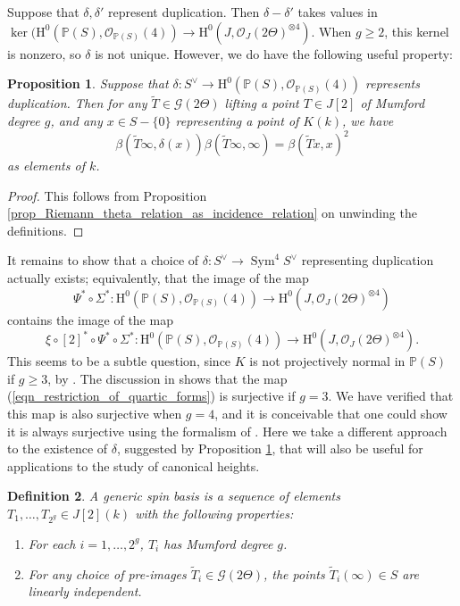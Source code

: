 \documentclass{article} %
\newtheorem{proposition}{Proposition}[section]
\newtheorem{definition}[proposition]{Definition}
\numberwithin{equation}{section}
\DeclareMathOperator{\Sym}{Sym}
\renewcommand{\P}{\mathbb{P}}
\renewcommand{\O}{\mathcal{O}}
\newcommand{\HH}{\mathrm{H}}
\newcommand{\cO}{\mathcal{O}}
\begin{document}
Suppose that $\delta, \delta'$ represent duplication. Then $\delta - \delta'$ takes values in $\ker(\HH^0(\P(S), \cO_{\P(S)}(4)) \to\HH^0(J, \O_J(2 \Theta)^{\otimes 4})$. When $g \geq 2$, this kernel is nonzero, so $\delta$ is not unique. However, we do have the following useful property:
\begin{proposition}\label{prop_pairing_delta_with_torsion_points}
    Suppose that $\delta : S^\vee \to\HH^0(\P(S), \cO_{\P(S)}(4))$ represents duplication. Then for any $\widetilde{T} \in \mathcal{G}(2 \Theta)$ lifting a point $T \in J[2]$ of Mumford degree $g$, and any $x \in S - \{ 0 \}$ representing a point of $K(k)$, we have
    \[ \beta( \widetilde{T} \infty, \delta(x)) \beta(\widetilde{T} \infty, \infty) = \beta(\widetilde{T} x,x)^2\]
    as elements of $k$. 
\end{proposition}
\begin{proof}
    This follows from Proposition \ref{prop_Riemann_theta_relation_as_incidence_relation} on unwinding the definitions. 
\end{proof}
It remains to show that a choice of $\delta : S^\vee \to \Sym^4 S^\vee$ representing duplication actually exists; equivalently, that the image of the map 
\begin{equation}\label{eqn_restriction_of_quartic_forms} \Psi^\ast \circ \Sigma^\ast :\HH^0(\P(S), \cO_{\P(S)}(4)) \to\HH^0(J, \O_J(2 \Theta)^{\otimes 4}) 
\end{equation}
contains the image of the map
\[ \xi \circ  [2]^\ast \circ \Psi^\ast \circ \Sigma^\ast:\HH^0(\P(S), \cO_{\P(S)}(4)) \to\HH^0(J, \O_J(2 \Theta)^{\otimes 4}). \]
This seems to be a subtle question, since $K$ is not projectively normal in $\P(S)$ if $g\geq 3$, by \cite[\S2.9.3]{Khaled-projectivenormalitykummer}. The discussion in \cite[\S 2]{Stoll-heightsgenus3} shows that the map (\ref{eqn_restriction_of_quartic_forms}) is surjective if $g = 3$. We have verified that this map is also surjective when $g = 4$, and it is conceivable that one could show it is always surjective using the formalism of \cite{Gru13}. Here we take a different approach to the existence of $\delta$, suggested by Proposition \ref{prop_pairing_delta_with_torsion_points}, that will also be useful for applications to the study of canonical heights. 
\begin{definition}
    A generic spin basis is a sequence of elements $T_1, \dots, T_{2^{g}} \in J[2](k)$ with the following properties:
    \begin{enumerate}
    \item For each $i = 1, \dots, {2^g}$, $T_i$ has Mumford degree $g$.
    \item For any choice of pre-images $\widetilde{T}_i \in \mathcal{G}(2 \Theta)$, the points $\widetilde{T}_i(\infty) \in S$ are linearly independent. 
    \end{enumerate}
\end{definition}
\end{document}
